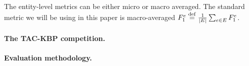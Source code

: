 The entity-level metrics can be either micro or macro averaged.
The standard metric we will be using in this paper is macro-averaged $F_1^e \stackrel{\rm def}{=} \frac{1}{|E|} \sum_{e \in E} F_1^{e}$.

\paragraph{The TAC-KBP competition.}
%

\paragraph{Evaluation methodology.}

